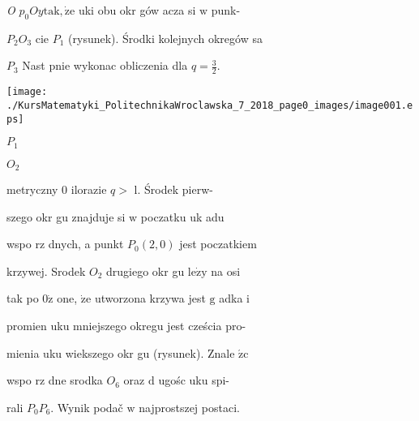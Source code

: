 \documentclass[a4paper,12pt]{article}
\begin{document}
{\it O} $p_{0} Oy \mathrm{t}\mathrm{a}\mathrm{k}, \dot{\mathrm{z}}\mathrm{e}$ uki obu okr gów acza si $\mathrm{w}$ punk-

$P_{2} O_{3}$ cie $P_{1}$ (rysunek). Środki kolejnych okregów sa

$P_{3}$ Nast pnie wykonac obliczenia dla $q=\displaystyle \frac{3}{2}.$
\begin{center}
\texttt{[image: ./KursMatematyki\_PolitechnikaWroclawska\_7\_2018\_page0\_images/image001.eps]}
\end{center}
$P_{1}$

$O_{2}$

metryczny $0$ ilorazie $q >$ l. Środek pierw-

szego okr gu znajduje si $\mathrm{w}$ poczatku uk adu

wspo rz dnych, a punkt $P_{0}(2,0)$ jest poczatkiem

krzywej. Srodek $O_{2}$ drugiego okr gu $\mathrm{l}\mathrm{e}\dot{\mathrm{z}}\mathrm{y}$ na osi

tak po $0\dot{\mathrm{z}}$ one, $\dot{\mathrm{z}}\mathrm{e}$ utworzona krzywa jest $\mathrm{g}$ adka $\mathrm{i}$

promien uku mniejszego okregu jest cześcia pro-

mienia uku wiekszego okr gu (rysunek). Znale $\acute{\mathrm{z}}\mathrm{c}$

wspo rz dne srodka $O_{6}$ oraz $\mathrm{d}$ ugośc uku spi-

rali $P_{0}P_{6}$. Wynik podač $\mathrm{w}$ najprostszej postaci.
\end{document}
